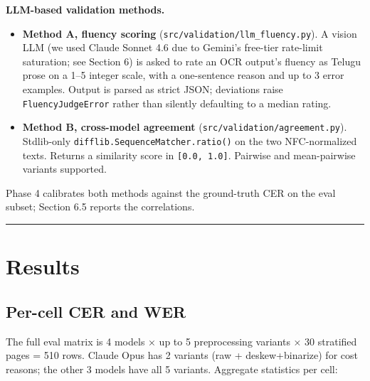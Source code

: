 \documentclass[
  letterpaper,
  DIV=11,
  numbers=noendperiod]{scrartcl}
\providecommand{\tightlist}{%
  \setlength{\itemsep}{0pt}\setlength{\parskip}{0pt}}
\begin{document}
\textbf{LLM-based validation methods.}

\begin{itemize}
\tightlist
\item
  \textbf{Method A, fluency scoring}
  (\texttt{src/validation/llm\_fluency.py}). A vision LLM (we used
  Claude Sonnet 4.6 due to Gemini's free-tier rate-limit saturation; see
  Section 6) is asked to rate an OCR output's fluency as Telugu prose on
  a 1--5 integer scale, with a one-sentence reason and up to 3 error
  examples. Output is parsed as strict JSON; deviations raise
  \texttt{FluencyJudgeError} rather than silently defaulting to a median
  rating.
\item
  \textbf{Method B, cross-model agreement}
  (\texttt{src/validation/agreement.py}). Stdlib-only
  \texttt{difflib.SequenceMatcher.ratio()} on the two NFC-normalized
  texts. Returns a similarity score in \texttt{{[}0.0,\ 1.0{]}}.
  Pairwise and mean-pairwise variants supported.
\end{itemize}

Phase 4 calibrates both methods against the ground-truth CER on the eval
subset; Section 6.5 reports the correlations.

\begin{center}\rule{0.5\linewidth}{0.5pt}\end{center}

\section{Results}\label{results}

\subsection{Per-cell CER and WER}\label{per-cell-cer-and-wer}

The full eval matrix is 4 models × up to 5 preprocessing variants × 30
stratified pages = 510 rows. Claude Opus has 2 variants (raw +
deskew+binarize) for cost reasons; the other 3 models have all 5
variants. Aggregate statistics per cell:
\end{document}
